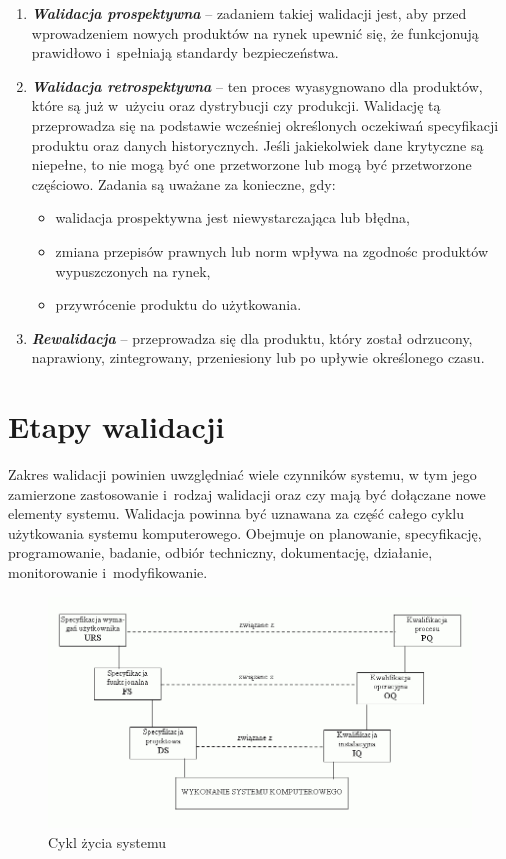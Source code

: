 \documentclass{xmgr}
\begin{document}
\begin{enumerate}
  \item \textbf{\textit{Walidacja prospektywna}} – zadaniem takiej walidacji jest, aby przed wprowadzeniem nowych produktów na rynek upewnić się, że funkcjonują prawidłowo i~spełniają standardy bezpieczeństwa.
  \item \textbf{\textit{Walidacja retrospektywna}} – ten proces wyasygnowano dla produktów, które są już w~użyciu oraz dystrybucji czy produkcji. Walidację tą przeprowadza się na podstawie wcześniej określonych oczekiwań specyfikacji produktu oraz danych historycznych. Jeśli jakiekolwiek dane krytyczne są niepełne, to nie mogą być one przetworzone lub mogą być przetworzone częściowo. Zadania są uważane za konieczne, gdy:
\begin{itemize}
\item walidacja prospektywna jest niewystarczająca lub błędna,
\item zmiana przepisów prawnych lub norm wpływa na zgodnośc produktów wypuszczonych na rynek,
\item przywrócenie produktu do użytkowania.
\end{itemize}
  \item \textbf{\textit{Rewalidacja}} – przeprowadza się dla produktu, który został odrzucony, naprawiony, zintegrowany, przeniesiony lub po upływie określonego czasu.\cite{Categories}
\end{enumerate}

\section{Etapy walidacji}
\indent \indent \indent Zakres walidacji powinien uwzględniać wiele czynników systemu, w tym jego zamierzone zastosowanie i~rodzaj walidacji oraz czy mają być dołączane nowe elementy systemu. Walidacja powinna być uznawana za część całego cyklu użytkowania systemu komputerowego. Obejmuje on planowanie, specyfikację, programowanie, badanie, odbiór techniczny, dokumentację, działanie, monitorowanie i~modyfikowanie.

\begin{figure}[th!]
\centering
\includegraphics[width=.7\hsize]{images/cykl}
\caption{Cykl życia systemu\label{RYS.3}}
\end{figure}
\end{document}
